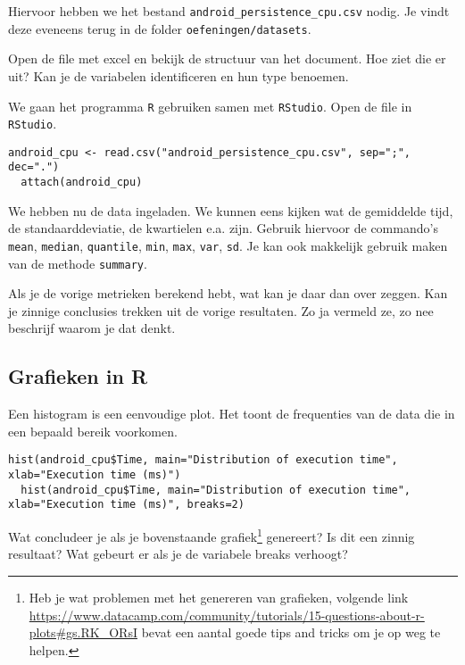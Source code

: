 Hiervoor hebben we het bestand \texttt{android\_persistence\_cpu.csv} nodig. Je vindt deze eveneens terug in de folder \texttt{oefeningen/datasets}.

\begin{exercise}
  \label{oef:casus-akin2016-1var}
	Open de file met excel en bekijk de structuur van het document. Hoe ziet die er uit? Kan je de variabelen identificeren en hun type benoemen. 
\end{exercise}

We gaan het programma \texttt{R} gebruiken samen met \texttt{RStudio}. Open de file in \texttt{RStudio}.

\begin{lstlisting}[breaklines=true]
  android_cpu <- read.csv("android_persistence_cpu.csv", sep=";", dec=".")
  attach(android_cpu)
\end{lstlisting}

We hebben nu de data ingeladen. We kunnen eens kijken wat de gemiddelde tijd, de standaarddeviatie, de kwartielen e.a. zijn. Gebruik hiervoor de commando's \texttt{mean}, \texttt{median}, \texttt{quantile}, \texttt{min}, \texttt{max}, \texttt{var}, \texttt{sd}. Je kan ook makkelijk gebruik maken van de methode \texttt{summary}.

\begin{exercise}
	Als je de vorige metrieken berekend hebt, wat kan je daar dan over zeggen. Kan je zinnige conclusies trekken uit de vorige resultaten. Zo ja vermeld ze, zo nee beschrijf waarom je dat denkt.
\end{exercise}


\subsection{Grafieken in R}


Een histogram is een eenvoudige plot. Het toont de frequenties van de data die in een bepaald bereik voorkomen. 

\begin{lstlisting}[breaklines=true]
  hist(android_cpu$Time, main="Distribution of execution time", xlab="Execution time (ms)")
  hist(android_cpu$Time, main="Distribution of execution time", xlab="Execution time (ms)", breaks=2)
\end{lstlisting}
\begin{exercise}
	Wat concludeer je als je bovenstaande grafiek\footnote{Heb je wat problemen met het genereren van grafieken, volgende link \url{https://www.datacamp.com/community/tutorials/15-questions-about-r-plots\#gs.RK_ORsI} bevat een aantal goede tips and tricks om je op weg te helpen.} genereert? Is dit een zinnig resultaat? Wat gebeurt er als je de variabele breaks verhoogt?
\end{exercise}

